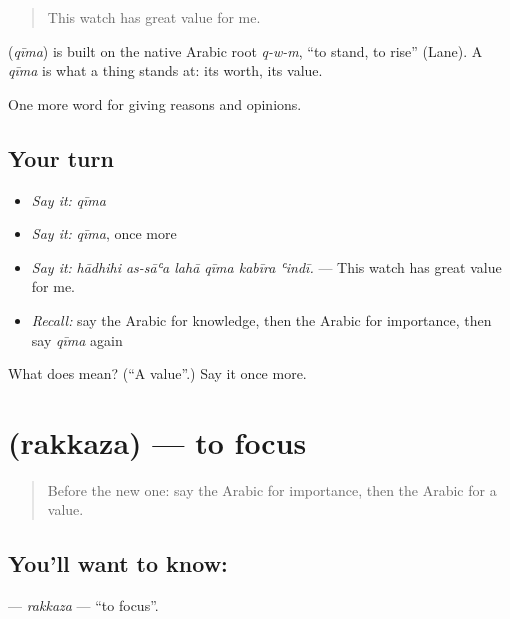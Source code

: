 \begin{quote}
This watch has great value for me.
\end{quote}

\begin{cousinweb}
\textbf{} (\emph{qīma}) is built on the native Arabic root \emph{q-w-m}, \textquotedblleft{}to stand, to rise\textquotedblright{} (Lane). A \emph{qīma} is what a thing stands at: its worth, its value.
\end{cousinweb}

\begin{grammarlens}[title={What you've built}]
One more word for giving reasons and opinions.
\end{grammarlens}

\subsection*{Your turn}
\begin{itemize}
\raggedright
  \item \emph{Say it:} \emph{qīma}
  \item \emph{Say it:} \emph{qīma}, once more
  \item \emph{Say it:} \emph{hādhihi as-sāʿa lahā qīma kabīra ʿindī.} — This watch has great value for me.
  \item \emph{Recall:} say the Arabic for knowledge, then the Arabic for importance, then say \emph{qīma} again
\end{itemize}

\begin{tcolorbox}[breakable,colback=teal!4,colframe=teal!35!black,title={Before you move on}]
What does  mean? (\textquotedblleft{}A value\textquotedblright{}.) Say it once more.
\end{tcolorbox}
\section[\texorpdfstring{\ar{ركز} (rakkaza)}{ركز (rakkaza)}]{ (rakkaza) — to focus}

\label{lesson:AR-C368-rakkaza}



\begin{quote}
Before the new one: say the Arabic for importance, then the Arabic for a value.
\end{quote}

\subsection*{You'll want to know: }
\textbf{} — \emph{rakkaza} — \textquotedblleft{}to focus\textquotedblright{}.

